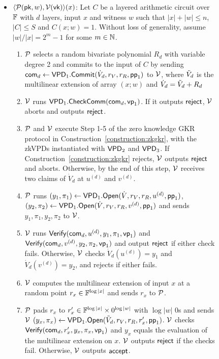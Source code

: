 \begin{figure}[H]
{{{{\begin{construction}
\begin{itemize}
		\item $\langle\P(\pk,w), \V(\vk)\rangle(x)$: Let $C$ be a layered arithmetic circuit over $\F$ with $d$ layers, input $x$ and witness $w$ such that $|x|+|w|\le n$, $|C|\le S$ and $C(x;w) =1$. Without loss of generality, assume $|w|/|x| = 2^m -1$ for some $m\in\N$.
		\begin{enumerate}
			\item $\P$ selects a random bivariate polynomial $R_d$ with variable degree 2 and commits to the input of $C$ by sending $\comm_d\leftarrow\VPD_1.\Commit(\dot{V}_d, r_V, r_R, \pp_1)$ to $\V$, where $\tV_d$ is the multilinear extension of array $(x;w)$ and $\dot{V}_d=\tV_d+R_d$
			\item $\V$ runs $\VPD_1.\CheckComm(\comm_d,\vp_1)$. If it outputs $\reject$, $\V$ aborts and outputs $\reject$.  
			\item $\P$ and $\V$ execute Step 1-5 of the zero knowledge GKR protocol in Construction~\ref{construction:zkgkr}, with the zkVPDs instantiated with $\VPD_2$ and $\VPD_3$. If Construction~\ref{construction:zkgkr} rejects, $\V$ outputs $\reject$ and aborts. Otherwise, by the end of this step, $\V$ receives two claims of $\dot{V}_d$ at $u^{(d)}$ and $v^{(d)}$.
			\item $\P$ runs $(y_1,\pi_1)\leftarrow\VPD_1.\Open(\dot{V}, r_V, r_R,u^{(d)},\pp_1)$,  $(y_2,\pi_2)\leftarrow\VPD_1.\Open(\dot{V}, r_V, r_R, v^{(d)},\pp_1)$ and sends $y_1,\pi_1,y_2,\pi_2$ to $\V$.
			\item $\V$ runs $\Verify(\comm_d,u^{(d)},y_1,\pi_1,\vp_1)$ and $\Verify(\comm_d,v^{(d)},y_2,\pi_2,\vp_1)$ and output $\reject$ if either check fails. Otherwise, $\V$ checks $\dot{V}_d(u^{(d)}) = y_1$ and $\dot{V}_d(v^{(d)}) = y_2$, and rejects if either fails.
			\item $\V$ computes the multilinear extension of input $x$ at a random point $r_x\in\F^{\log |x|}$ and sends $r_x$ to $\P$.
			\item $\P$ pads $r_x$ to $r'_x\in\F^{\log |x|}\times 0^{\log |w|}$ with $\log |w|$ 0s and sends $\V$ $(y_x,\pi_x)\leftarrow\VPD_1.\Open(\tV_d, r_V, r_R, r'_x,\pp_1)$. $\V$ checks $\Verify(\comm_d,r'_x,y_x,\pi_x,\vp_1)$ and $y_x$ equals the evaluation of the multilinear extension on $x$. $\V$ outputs $\reject$ if the checks fail. Otherwise, $\V$ outputs $\accept$.
		\end{enumerate}
		
	\end{itemize}
\end{construction}}}}}
\end{figure}
